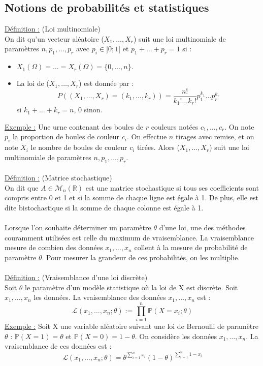 \documentclass[12pt]{article}
\newcommand{\R}{\mathbb{R}}
\newcommand{\defin}{\underline{Définition :} }
\newcommand{\exemple}{\underline{Exemple :} }
\begin{document}
\subsection{Notions de probabilités et statistiques}
\defin (Loi multinomiale)\\
On dit qu'un vecteur aléatoire ($X_1, \dots, X_r$) suit une loi multinomiale de paramètres $n, p_1, \dots, p_r$ avec $p_i \in ]0;1[$ et $p_1 + \dots + p_r = 1$ si :\\
\begin{itemize}
    \item $X_1(\Omega) = \dots = X_r(\Omega) = \{0,\dots,n\}.$\\
    \item La loi de ($X_1, \dots, X_r$) est donnée par :\[ P((X_1, \dots, X_r) =(k_1, \dots, k_r)) = \frac{n!}{k_1!\dots k_r!}p_1^{k_1}\dots p_r^{k_r}\] si $k_1 + \dots + k_r = n$, 0 sinon.\\
\end{itemize}
\exemple Une urne contenant des boules de $r$ couleurs notées $c_1, \dots, c_r$. On note $p_i$ la proportion de boules de couleur $c_i$. On effectue $n$ tirages avec remise, et on note $X_i$ le nombre de boules de couleur $c_i$ tirées. Alors ($X_1, \dots, X_r$) suit une loi multinomiale de paramètres  $n, p_1, \dots, p_r$.\\
\\
\defin (Matrice stochastique)\\
On dit que $A \in \mathcal{M}_n(\R)$ est une matrice stochastique si tous ses coefficients sont compris entre 0 et 1 et si la somme de chaque ligne est égale à 1. De plus, elle est dite bistochastique si la somme de chaque colonne est égale à 1.\\
\\
Lorsque l'on souhaite déterminer un paramètre $\theta$ d'une loi, une des méthodes couramment utilisées est celle du maximum de vraisemblance. La vraisemblance mesure de combien des données $x_1, \dots, x_n$ collent à la mesure de probabilité de paramètre $\theta$. Pour mesurer la grandeur de ces probabilités, on les multiplie.\\
\\
\defin (Vraisemblance d'une loi discrète)\\
Soit $\theta$ le paramètre d'un modèle statistique où la loi de X est discrète. Soit $x_1, \dots, x_n$ les données. La vraisemblance des données $x_1, \dots, x_n$  est :\[
\mathcal{L}(x_1, \dots, x_n ; \theta) := \prod^n_{i=1} \mathbb{P}(X= x_i ; \theta)
\]
\exemple Soit X une variable aléatoire suivant une loi de Bernoulli de paramètre $\theta$ : $\mathbb{P}(X=1) = \theta$ et $\mathbb{P}(X=0) = 1- \theta$. On considère les données $x_1, \dots, x_n$. La vraisemblance de ces données est :\[
\mathcal{L}(x_1, \dots, x_n ; \theta) = \theta^{\sum^n_{i=1}x_i}(1-\theta)^{\sum^n_{i=1}1- x_i}
\]
\end{document}
